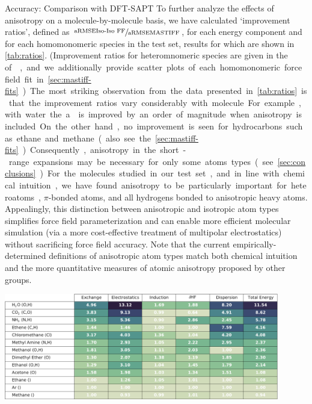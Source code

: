 \begin{subsection}{Accuracy: Comparison with DFT-SAPT}
To further analyze the effects of anisotropy on a molecule-by-molecule basis, we have calculated
`improvement ratios', defined as 
$\sfrac{\text{a\rmse \isoff}}{\text{a\rmse \mastiff}}$,
for each energy component and for
each homomonomeric species in the test set, results for which are shown in
\cref{tab:ratios}. 
(Improvement ratios for heteromnomeric species are given in the \si of
, and we additionally provide
scatter plots of each homomonomeric force field fit in \cref{sec:mastiff-fits}.)

The most striking observation from the data presented in \cref{tab:ratios} is that
the improvement ratios vary considerably with molecule. For example, with water
the a\rmse is improved by an order of magnitude when anisotropy is included. On
the other hand, no improvement is seen for hydrocarbons such as ethane and
methane (also see the \cref{sec:mastiff-fits}). Consequently, anisotropy in the short-range expansions
may be necessary for only some atoms types (see \cref{sec:conclusions}). For the molecules
studied in our test set, and in line with chemical intuition, we have found
anisotropy to be particularly important for 
heteroatoms, $\pi$-bonded atoms,
and all hydrogens bonded to anisotropic heavy atoms. 
Appealingly, this distinction between anisotropic and
isotropic atom types 
simplifies force field parameterization and can enable more efficient molecular
simulation (via a more cost-effective treatment of multipolar electrostatics) without sacrificing force field accuracy.
Note that the current empirically-determined
definitions of anisotropic atom types
match both chemical intuition and the more quantitative measures
of atomic anisotropy proposed by other groups.\cite{Kramer2014,Wheatley2012}


    \begin{table}[ht]
    \includegraphics[width=0.9\textwidth]{anisotropic/figures/homodimer_error_ratios.pdf}
    \caption{
`Improvement Ratios' for each homomonomeric species in the
91 dimer test set. For each dimer and energy component, the improvement ratio
is calculated as the ratio of a\rmse between \isoff and \mastiff; values
greater than 1 indicate decreased errors in the anisotropic model. Entries have
been ordered according to the improvement ratio for the total energy.
            }
    \label{tab:ratios}
    \end{table}



\end{subsection}

